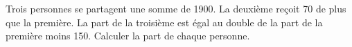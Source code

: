 Trois personnes se partagent une somme de \qty{1900}{\EURO}. 
La deuxième reçoit \qty{70}{\EURO} de plus que la première. 
La part de la troisième est égal au double de la part de la première moins \qty{150}{\EURO}. 
Calculer la part de chaque personne.